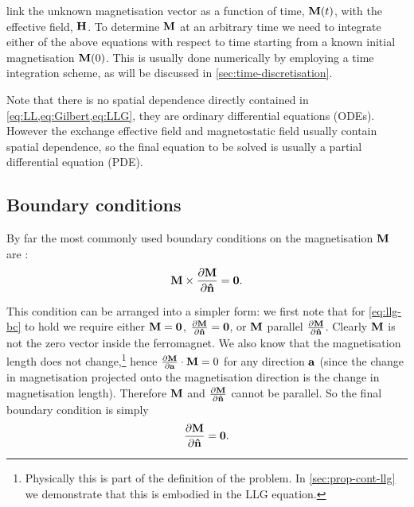 link the unknown magnetisation vector as a function of time, $\boldsymbol{\mathrm{M}}(t)$, with the effective field, $\boldsymbol{\mathrm{H}}$.
To determine $\boldsymbol{\mathrm{M}}$ at an arbitrary time we need to integrate either of the above equations with respect to time starting from a known initial magnetisation $\boldsymbol{\mathrm{M}}(0)$.
This is usually done numerically by employing a time integration scheme, as will be discussed in \cref{sec:time-discretisation}.

Note that there is no spatial dependence directly contained in \cref{eq:LL,eq:Gilbert,eq:LLG}, \ie they are ordinary differential equations (ODEs).
However the exchange effective field and magnetostatic field usually contain spatial dependence, so the final equation to be solved is usually a partial differential equation (PDE).



\subsection{Boundary conditions}
\label{sec:magn-bound-cond}

By far the most commonly used boundary conditions on the magnetisation $\boldsymbol{\mathrm{M}}$ are \cite[178, 181]{Aharoni1996} \cite{Rado1959}:
\begin{equation}
  \label{eq:llg-bc}
  \boldsymbol{\mathrm{M}} \times \frac{\partial \boldsymbol{\mathrm{M}}}{\partial \boldsymbol{\mathrm{\hat{n}}}} = \mathbf{0}.
\end{equation}

This condition can be arranged into a simpler form: we first note that for \cref{eq:llg-bc} to hold we require either $\boldsymbol{\mathrm{M}} = \mathbf{0}$, $\frac{\partial \boldsymbol{\mathrm{M}}}{\partial \boldsymbol{\mathrm{\hat{n}}}} = \mathbf{0}$, or $\boldsymbol{\mathrm{M}}$ parallel $\frac{\partial \boldsymbol{\mathrm{M}}}{\partial \boldsymbol{\mathrm{\hat{n}}}}$.
Clearly $\boldsymbol{\mathrm{M}}$ is not the zero vector inside the ferromagnet.
We also know that the magnetisation length does not change,\footnote{Physically this is part of the definition of the problem. In \cref{sec:prop-cont-llg} we demonstrate that this is embodied in the LLG equation.}
hence $\frac{\partial \boldsymbol{\mathrm{M}}}{\partial {\boldsymbol{\mathrm{a}}}} \cdot \boldsymbol{\mathrm{M}} = 0$ for any direction ${\boldsymbol{\mathrm{a}}}$ (since the change in magnetisation projected onto the magnetisation direction is the change in magnetisation length).
Therefore $\boldsymbol{\mathrm{M}}$ and $\frac{\partial \boldsymbol{\mathrm{M}}}{\partial \boldsymbol{\mathrm{\hat{n}}}}$ cannot be parallel.
So the final boundary condition is simply
\begin{equation}
  \label{eq:94}
  \frac{\partial \boldsymbol{\mathrm{M}}}{\partial \boldsymbol{\mathrm{\hat{n}}}} = \mathbf{0}.
\end{equation}


